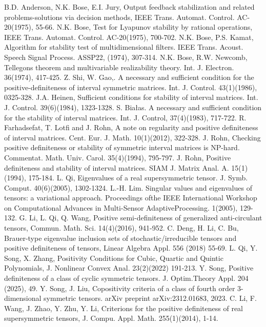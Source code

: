 \documentclass[twoside]{article}
\begin{document}
\begin{thebibliography}{ }
 B.D. Anderson, N.K. Bose, E.I. Jury, Output feedback stabilization and related problems-solutions via decision methods, IEEE Trans. Automat. Control. AC-20(1975), 55-66.
 N.K. Bose, Test for Lyapunov stability by rational operations, IEEE Trans. Automat. Control. AC-20(1975), 700-702.
 N.K. Bose, P.S. Kamat, Algorithm for stability test of multidimensional filters. IEEE Trans. Acoust. Speech Signal Process. ASSP22, (1974), 307-314.
 N.K. Bose, R.W. Newcomb, Tellegons theorem and multivariable realizability theory. Int. J. Electron. 36(1974), 417-425.
 Z. Shi, W. Gao,. A necessary and sufficient condition for the positive-definiteness of interval symmetric matrices. Int. J. Control. 43(1)(1986), 0325-328.
 J.A. Heinen, Sufficient conditions for stability of interval matrices. Int. J. Control. 39(6)(1984), 1323-1328.
 S. Bia{\l}as. A necessary and sufficient condition for the stability of interval matrices. Int. J. Control, 37(4)(1983), 717-722.
 R. Farhadsefat, T. Lotfi and J. Rohn, A note on regularity and positive definiteness of interval matrices. Cent. Eur. J. Math. 10(1)(2012), 322-328.
 J. Rohn, Checking positive definiteness or stability of symmetric interval matrices is NP-hard. Commentat. Math. Univ. Carol. 35(4)(1994), 795-797.
 J. Rohn, Positive definiteness and stability of interval matrices. SIAM J. Matrix Anal. A. 15(1)(1994), 175-184.
 L. Qi, Eigenvalues of a real supersymmetric tensor. J. Symb. Comput. 40(6)(2005), 1302-1324.
 L.-H. Lim. Singular values and eigenvalues of tensors: a variational approach. Proceedings ofthe IEEE International Workshop on Computational Advances in Multi-Sensor AdaptiveProcessing. 1(2005), 129-132.
 G. Li, L. Qi, Q. Wang, Positive semi-definiteness of generalized anti-circulant tensors, Commun. Math. Sci. 14(4)(2016), 941-952.
C. Deng, H. Li, C. Bu, Brauer-type eigenvalue inclusion sets of stochastic/irreducible tensors and positive definiteness of tensors, Linear Algebra Appl. 556 (2018) 55-69.
 L. Qi, Y. Song, X. Zhang, Positivity Conditions for Cubic, Quartic and Quintic Polynomials, J. Nonlinear Convex Anal. 23(2)(2022) 191-213.
 Y. Song, Positive definiteness of a class of cyclic symmetric tensors. J. Optim.Theory  Appl. 204 (2025), 49.
 Y. Song, J. Liu, Copositivity criteria of a class of fourth order $3$-dimensional symmetric tensors. arXiv preprint arXiv:2312.01683, 2023.
C. Li, F. Wang, J. Zhao, Y. Zhu, Y. Li,  Criterions for the positive definiteness of real supersymmetric tensors, J. Compu. Appl. Math. 255(1)(2014), 1-14.

\end{thebibliography}
\end{document}
